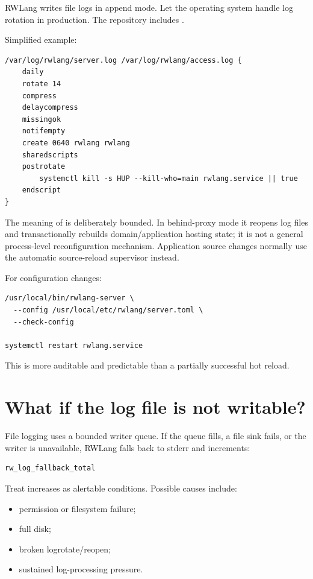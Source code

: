 RWLang writes file logs in append mode. Let the operating system handle log rotation in production. The repository includes .

Simplified example:

\begin{lstlisting}
/var/log/rwlang/server.log /var/log/rwlang/access.log {
    daily
    rotate 14
    compress
    delaycompress
    missingok
    notifempty
    create 0640 rwlang rwlang
    sharedscripts
    postrotate
        systemctl kill -s HUP --kill-who=main rwlang.service || true
    endscript
}
\end{lstlisting}

The meaning of  is deliberately bounded. In behind-proxy mode it reopens log files and transactionally rebuilds domain/application hosting state; it is not a general process-level  reconfiguration mechanism. Application source changes normally use the automatic source-reload supervisor instead.

For configuration changes:

\begin{lstlisting}
/usr/local/bin/rwlang-server \
  --config /usr/local/etc/rwlang/server.toml \
  --check-config

systemctl restart rwlang.service
\end{lstlisting}

This is more auditable and predictable than a partially successful hot reload.

\section{What if the log file is not writable?}

File logging uses a bounded writer queue. If the queue fills, a file sink fails, or the writer is unavailable, RWLang falls back to stderr and increments:

\begin{lstlisting}
rw_log_fallback_total
\end{lstlisting}

Treat increases as alertable conditions. Possible causes include:

\begin{itemize}
  \item permission or filesystem failure;
  \item full disk;
  \item broken logrotate/reopen;
  \item sustained log-processing pressure.
\end{itemize}

